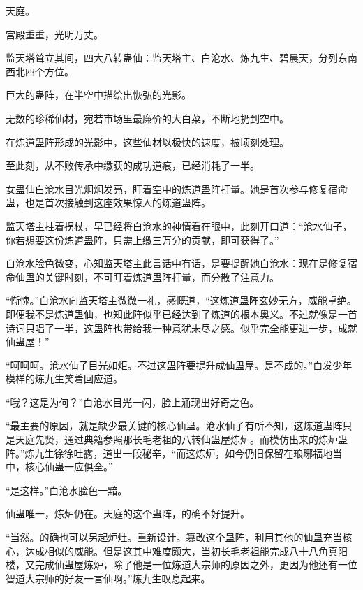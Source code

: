 
\begin{this_body}



天庭。

宫殿重重，光明万丈。

监天塔耸立其间，四大八转蛊仙：监天塔主、白沧水、炼九生、碧晨天，分列东南西北四个方位。

巨大的蛊阵，在半空中描绘出恢弘的光影。

无数的珍稀仙材，宛若市场里最廉价的大白菜，不断地扔到空中。

在炼道蛊阵形成的光影中，这些仙材以极快的速度，被顷刻处理。

至此刻，从不败传承中缴获的成功道痕，已经消耗了一半。

女蛊仙白沧水目光炯炯发亮，盯着空中的炼道蛊阵打量。她是首次参与修复宿命蛊，也是首次接触到这座效果惊人的炼道蛊阵。

监天塔主拄着拐杖，早已经将白沧水的神情看在眼中，此刻开口道：“沧水仙子，你若想要这份炼道蛊阵，只需上缴三万分的贡献，即可获得了。”

白沧水脸色微变，心知监天塔主此言话中有话，是要提醒她白沧水：现在是修复宿命仙蛊的关键时刻，不可盯着炼道蛊阵打量，而分散了注意力。

“惭愧。”白沧水向监天塔主微微一礼，感慨道，“这炼道蛊阵玄妙无方，威能卓绝。即便我不是炼道蛊仙，也知此阵似乎已经达到了炼道的根本奥义。不过就像是一首诗词只唱了一半，这蛊阵也带给我一种意犹未尽之感。似乎完全能更进一步，成就仙蛊屋！”

“呵呵呵。沧水仙子目光如炬。不过这蛊阵要提升成仙蛊屋。是不成的。”白发少年模样的炼九生笑着回应道。

“哦？这是为何？”白沧水目光一闪，脸上涌现出好奇之色。

“最主要的原因，就是缺少最关键的核心仙蛊。沧水仙子有所不知，这炼道蛊阵只是天庭先贤，通过典籍参照那长毛老祖的八转仙蛊屋炼炉。而模仿出来的炼炉蛊阵。”炼九生徐徐吐露，道出一段秘辛，“而这炼炉，如今仍旧保留在琅琊福地当中，核心仙蛊一应俱全。”

“是这样。”白沧水脸色一黯。

仙蛊唯一，炼炉仍在。天庭的这个蛊阵，的确不好提升。

“当然。的确也可以另起炉灶。重新设计。篡改这个蛊阵，利用其他的仙蛊充当核心，达成相似的威能。但是这其中难度颇大，当初长毛老祖能完成八十八角真阳楼，又完成仙蛊屋炼炉，除了他是一位炼道大宗师的原因之外，更因为他还有一位智道大宗师的好友一言仙啊。”炼九生叹息起来。


\end{this_body}
